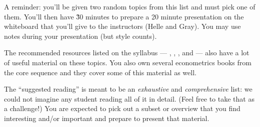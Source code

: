 \documentclass[nofonts,nols]{tufte-handout}
\begin{document}
\begin{fullwidth}
\noindent%
A reminder: you'll be given two random topics from this list and must
pick one of them. You'll then have \~30 minutes to prepare a 20 minute
presentation on the whiteboard that you'll give to the instructors
(Helle and Gray). You may use notes during your presentation (but
style counts).

The recommended resources listed on the syllabus --- \citep{Lu06},
\citep{Ca07}, \citep{MS08}, and \citep{SW08} --- also have a lot of
useful material on these topics. You also own several econometrics
books from the core sequence and they cover some of this material as
well.

The ``suggested reading'' is meant to be an \emph{exhaustive} and
\emph{comprehensive} list: we could not imagine any student reading
all of it in detail. (Feel free to take that as a challenge!) You are
expected to pick out a subset or overview that you find interesting
and/or important and prepare to present that material.



\end{fullwidth}
\end{document}
